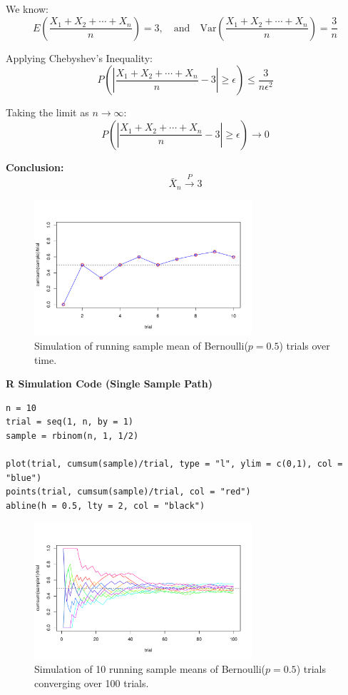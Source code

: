 We know:
\[
E\left( \frac{X_1 + X_2 + \cdots + X_n}{n} \right) = 3, \quad \text{and} \quad
\mathrm{Var}\left( \frac{X_1 + X_2 + \cdots + X_n}{n} \right) = \frac{3}{n}
\]

Applying Chebyshev’s Inequality:
\[
P\left( \left| \frac{X_1 + X_2 + \cdots + X_n}{n} - 3 \right| \geq \epsilon \right) \leq \frac{3}{n \epsilon^2}
\]

Taking the limit as \( n \to \infty \):
\[
P\left( \left| \frac{X_1 + X_2 + \cdots + X_n}{n} - 3 \right| \geq \epsilon \right) \to 0
\]

\textbf{Conclusion:}
\[
\bar{X}_n \xrightarrow{P} 3
\]

\begin{figure}[h!]
  \centering
  \includegraphics[width=0.72\textwidth]{Section5/simulation_plot.pdf}
  \caption{Simulation of running sample mean of Bernoulli(\(p = 0.5\)) trials over time.}
\end{figure}

{\color{gray} \textbf{R Simulation Code (Single Sample Path)}}

\begin{verbatim}
n = 10
trial = seq(1, n, by = 1)
sample = rbinom(n, 1, 1/2)

plot(trial, cumsum(sample)/trial, type = "l", ylim = c(0,1), col = "blue")
points(trial, cumsum(sample)/trial, col = "red")
abline(h = 0.5, lty = 2, col = "black")
\end{verbatim}

\begin{figure}[h!]
  \centering
  \includegraphics[width=0.72\textwidth]{Section5/simulation_multi.pdf}
  \caption{Simulation of 10 running sample means of Bernoulli(\(p = 0.5\)) trials converging over 100 trials.}
\end{figure}


